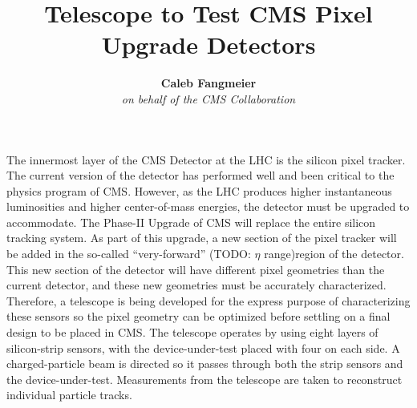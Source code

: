\documentclass[final]{beamer}
\title{Telescope to Test CMS Pixel Upgrade Detectors} %
\author{\textbf{Caleb Fangmeier} \\\textit{on behalf of the CMS Collaboration}} %
\institute{Department of Physics \& Astronomy \\ \textit{University of Nebraska \-- Lincoln}} %
\begin{document}

\setlength{\belowcaptionskip}{2ex} %
\setlength\belowdisplayshortskip{2ex} %

\begin{frame}[t] %
  \small
  The innermost layer of the CMS Detector at the LHC is the silicon pixel tracker. The current version of the detector has performed well and been critical to the physics program of CMS\@.  However, as the LHC produces higher instantaneous luminosities and higher center-of-mass energies, the detector must be upgraded to accommodate. The Phase-II Upgrade of CMS will replace the entire silicon tracking system.  As part of this upgrade, a new section of the pixel tracker will be added in the so-called ``very-forward'' (TODO: $\eta$ range)region of the detector.  This new section of the detector will have different pixel geometries than the current detector, and these new geometries must be accurately characterized.  Therefore, a telescope is being developed for the express purpose of characterizing these sensors so the pixel geometry can be optimized before settling on a final design to be placed in CMS\@. The telescope operates by using eight layers of silicon-strip sensors, with the device-under-test placed with four on each side. A charged-particle beam is directed so it passes through both the strip sensors and the device-under-test. Measurements from the telescope are taken to reconstruct individual particle tracks.



\end{frame}
\end{document}
